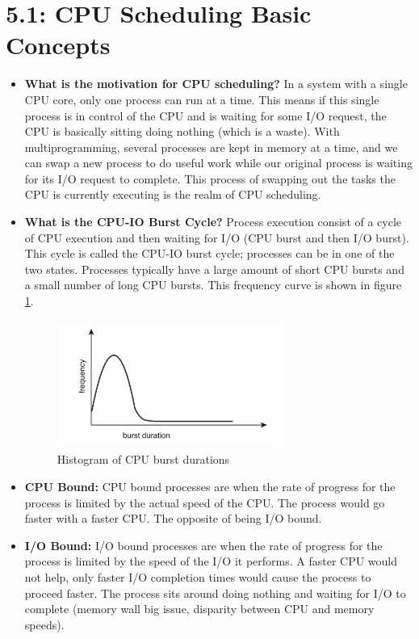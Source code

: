 \documentclass[12pt]{article}
\begin{document}
\section*{5.1: CPU Scheduling Basic Concepts}

\begin{itemize}
    \item \textbf{What is the motivation for CPU scheduling?} In a system with a single CPU core, only one process can run at a time. This means if this single process is in control of the CPU and is waiting for some I/O request, the CPU is basically sitting doing nothing (which is a waste). With multiprogramming, several processes are kept in memory at a time, and we can swap a new process to do useful work while our original process is waiting for its I/O request to complete. This process of swapping out the tasks the CPU is currently executing is the realm of CPU scheduling.
    \item \textbf{What is the CPU-IO Burst Cycle?} Process execution consist of a cycle of CPU execution and then waiting for I/O (CPU burst and then I/O burst). This cycle is called the CPU-IO burst cycle; processes can be in one of the two states. Processes typically have a large amount of short CPU bursts and a small number of long CPU bursts. This frequency curve is shown in figure \ref{fig:cpu-io-burst}.
        \begin{figure}[ht]
            \centering
            \includegraphics[width=0.7\textwidth]{figures/cpu-io-burst.jpg}
            \caption{Histogram of CPU burst durations}
            \label{fig:cpu-io-burst}
        \end{figure}
    \item \textbf{CPU Bound:} CPU bound processes are when the rate of progress for the process is limited by the actual speed of the CPU. The process would go faster with a faster CPU. The opposite of being I/O bound.
    \item \textbf{I/O Bound:}  I/O bound processes are when the rate of progress for the process is limited by the speed of the I/O it performs. A faster CPU would not help, only faster I/O completion times would cause the process to proceed faster. The process sits around doing nothing and waiting for I/O to complete (memory wall big issue, disparity between CPU and memory speeds).

\end{itemize}
\end{document}

